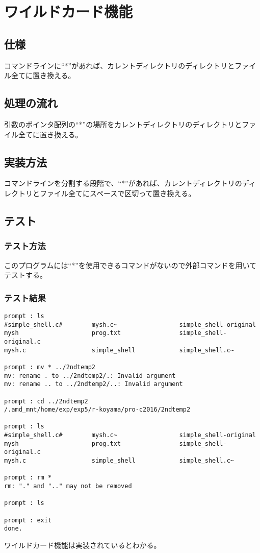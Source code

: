 \documentclass{procreport}
\begin{document}
\section{ワイルドカード機能}

\subsection{仕様}
コマンドラインに``*''があれば、カレントディレクトリのディレクトリとファイル全てに置き換える。
\subsection{処理の流れ}
引数のポインタ配列の``*''の場所をカレントディレクトリのディレクトリとファイル全てに置き換える。
\subsection{実装方法}
コマンドラインを分割する段階で、``*''があれば、カレントディレクトリのディレクトリとファイル全てにスペースで区切って置き換える。
\subsection{テスト}
\subsubsection{テスト方法}
このプログラムには``*''を使用できるコマンドがないので外部コマンドを用いてテストする。
\subsubsection{テスト結果}
\begin{screen}
\begin{verbatim}
prompt : ls
#simple_shell.c#        mysh.c~                 simple_shell-original
mysh                    prog.txt                simple_shell-original.c
mysh.c                  simple_shell            simple_shell.c~

prompt : mv * ../2ndtemp2
mv: rename . to ../2ndtemp2/.: Invalid argument
mv: rename .. to ../2ndtemp2/..: Invalid argument

prompt : cd ../2ndtemp2
/.amd_mnt/home/exp/exp5/r-koyama/pro-c2016/2ndtemp2

prompt : ls
#simple_shell.c#        mysh.c~                 simple_shell-original
mysh                    prog.txt                simple_shell-original.c
mysh.c                  simple_shell            simple_shell.c~

prompt : rm *
rm: "." and ".." may not be removed

prompt : ls

prompt : exit
done.
\end{verbatim}
\end{screen}
ワイルドカード機能は実装されているとわかる。
\end{document}
